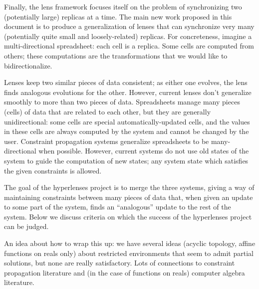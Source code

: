 Finally, the lens framework focuses itself on the problem of synchronizing
two (potentially large) replicas at a time. The main new work proposed in
this document is to produce a generalization of lenses that can synchronize
very many (potentially quite small and loosely-related) replicas. For
concreteness, imagine a multi-directional spreadsheet: each cell is a
replica. Some cells are computed from others; these computations are the
transformations that we would like to bidirectionalize.

Lenses keep two similar pieces of data consistent; as either one evolves,
the lens finds analogous evolutions for the other. However, current lenses
don't generalize smoothly to more than two pieces of data. Spreadsheets
manage many pieces (cells) of data that are related to each other, but they
are generally unidirectional: some cells are special automatically-updated
cells, and the values in these cells are always computed by the system and
cannot be changed by the user. Constraint propagation systems generalize
spreadsheets to be many-directional when possible. However, current systems
do not use old states of the system to guide the computation of new states;
any system state which satisfies the given constraints is allowed.

The goal of the hyperlenses project is to merge the three systems, giving a
way of maintaining constraints between many pieces of data that, when given
an update to some part of the system, finds an ``analogous'' update to the
rest of the system. Below we discuss criteria on which the success of the
hyperlenses project can be judged.

An idea about how to wrap this up: we have several ideas (acyclic topology,
affine functions on reals only) about restricted environments that seem to
admit partial solutions, but none are really satisfactory. Lots of
connections to constraint propagation literature and (in the case of
functions on reals) computer algebra literature.

